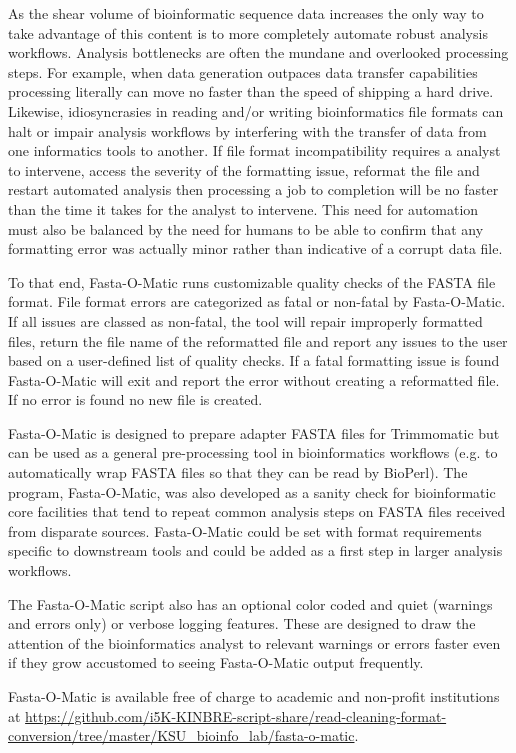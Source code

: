 As the shear volume of bioinformatic sequence data increases the only way to take advantage of this content is to more completely automate robust analysis workflows. Analysis bottlenecks are often the mundane and overlooked processing steps. For example, when data generation outpaces data transfer capabilities processing literally can move no faster than the speed of shipping a hard drive. Likewise, idiosyncrasies in reading and/or writing bioinformatics file formats can halt or impair analysis workflows by interfering with the transfer of data from one informatics tools to another. If file format incompatibility requires a analyst to intervene, access the severity of the formatting issue, reformat the file and restart automated analysis then processing a job to completion will be no faster than the time it takes for the analyst to intervene. This need for automation must also be balanced by the need for humans to be able to confirm that any formatting error was actually minor rather than indicative of a corrupt data file. 

To that end, Fasta-O-Matic runs customizable quality checks of the FASTA file format. File format errors are categorized as fatal or non-fatal by Fasta-O-Matic.  If all issues are classed as non-fatal, the tool will repair improperly formatted files, return the file name of the reformatted file and report any issues to the user based on a user-defined list of quality checks. If a fatal formatting issue is found Fasta-O-Matic will exit and report the error without creating a reformatted file. If no error is found no new file is created.

Fasta-O-Matic is designed to prepare adapter FASTA files for Trimmomatic but can be used as a general pre-processing tool in bioinformatics workflows (e.g. to automatically wrap FASTA files so that they can be read by BioPerl). The program, Fasta-O-Matic, was also developed as a sanity check for bioinformatic core facilities that tend to repeat common analysis steps on FASTA files received from disparate sources. Fasta-O-Matic could be set with format requirements specific to downstream tools and could be added as a first step in larger analysis workflows.

The Fasta-O-Matic script also has an optional color coded and quiet (warnings and errors only) or verbose logging features. These are designed to draw the attention of the bioinformatics analyst to relevant warnings or errors faster even if they grow accustomed to seeing Fasta-O-Matic output frequently.

Fasta-O-Matic is available free of charge to academic and non-profit institutions at \url{https://github.com/i5K-KINBRE-script-share/read-cleaning-format-conversion/tree/master/KSU\_bioinfo\_lab/fasta-o-matic}.